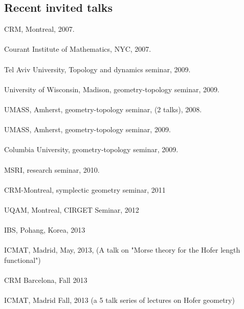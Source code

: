 \documentclass[overlapped,line,letterpaper]{res}
\begin{document}
\begin{resume}
\section {\sc Recent invited talks}
 CRM, Montreal,  2007. \\\\
   Courant Institute of 
Mathematics, NYC, 2007.  \\\\
Tel Aviv University, Topology and dynamics seminar, 2009. \\\\
University of Wisconsin, Madison, geometry-topology seminar, 2009. \\\\
 UMASS, Amherst, geometry-topology seminar,  (2 talks), 2008. \\\\
 UMASS, Amherst, geometry-topology seminar, 2009. \\\\
Columbia University, geometry-topology seminar, 2009. \\\\
MSRI, research seminar, 2010. \\\\
CRM-Montreal, symplectic geometry seminar, 2011\\\\
UQAM, Montreal, CIRGET Seminar, 2012 \\\\
IBS, Pohang, Korea, 2013 \\\\
ICMAT, Madrid, May, 2013,   (A talk on "Morse theory for the Hofer length functional") \\\\
CRM Barcelona, Fall 2013  \\\\
ICMAT, Madrid Fall, 2013 (a 5 talk series of lectures on Hofer geometry) \\\\

\end{resume}
\end{document}

